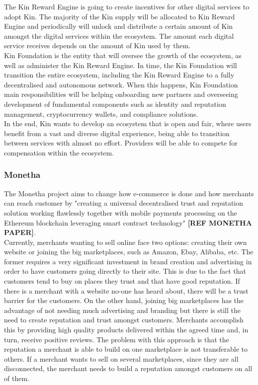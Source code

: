 The Kin Reward Engine is going to create incentives for other digital services to adopt Kin. The majority of the Kin supply will be allocated to Kin Reward Engine and periodically will unlock and distribute a certain amount of Kin amongst the digital services within the ecosystem. The amount each digital service receives depends on the amount of Kin used by them. \\

Kin Foundation is the entity that will oversee the growth of the ecosystem, as well as administer the Kin Reward Engine. In time, the Kin Foundation will transition the entire ecosystem, including the Kin Reward Engine to a fully decentralised and autonomous network. When this happens, Kin Foundation main responsibilities will be helping onboarding new partners and overseeing development of fundamental components such as identity and reputation management, cryptocurrency wallets, and compliance solutions. \\

In the end, Kin wants to develop an ecosystem that is open and fair, where users benefit from a vast and diverse digital experience, being able to transition between services with almost no effort. Providers will be able to compete for compensation within the ecosystem.

\subsubsection{Monetha}

The Monetha project aims to change how e-commerce is done and how merchants can reach customer by "creating a universal decentralised trust and reputation solution working flawlessly together with mobile payments processing on the Ethereum blockchain leveraging smart contract technology" \textbf{[REF MONETHA PAPER]}. \\

Currently, merchants wanting to sell online face two options: creating their own website or joining the big marketplaces, such as Amazon, Ebay, Alibaba, etc. The former requires a very significant investment in brand creation and advertising in order to have customers going directly to their site. This is due to the fact that customers tend to buy on places they trust and that have good reputation. If there is a merchant with a website no-one has heard about, there will be a trust barrier for the customers. On the other hand, joining big marketplaces has the advantage of not needing much advertising and branding but there is still the need to create reputation and trust amongst customers. Merchants accomplish this by providing high quality products delivered within the agreed time and, in turn, receive positive reviews. The problem with this approach is that the reputation a merchant is able to build on one marketplace is not transferable to others. If a merchant wants to sell on several marketplaces, since they are all disconnected, the merchant needs to build a reputation amongst customers on all of them. \\

